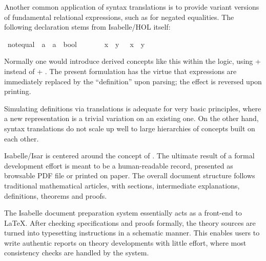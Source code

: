 \begin{isabellebody}
\begin{isamarkuptext}
  \medskip Another common application of syntax translations is to
  provide variant versions of fundamental relational expressions, such
  as \isa{{\isasymnoteq}} for negated equalities.  The following declaration
  stems from Isabelle/HOL itself:%
\end{isamarkuptext}%
\isamarkuptrue%
\ {\isachardoublequote}{\isacharunderscore}not{\isacharunderscore}equal{\isachardoublequote}\ {\isacharcolon}{\isacharcolon}\ {\isachardoublequote}{\isacharprime}a\ {\isasymRightarrow}\ {\isacharprime}a\ {\isasymRightarrow}\ bool{\isachardoublequote}\ \ \ \ {\isacharparenleft}\ {\isachardoublequote}{\isasymnoteq}{\isasymignore}{\isachardoublequote}\ {}{}{\isacharparenright}\isanewline
\isamarkupfalse%
\ {\isachardoublequote}x\ {\isasymnoteq}{\isasymignore}\ y{\isachardoublequote}\ {\isasymrightleftharpoons}\ {\isachardoublequote}{\isasymnot}\ {\isacharparenleft}x\ {\isacharequal}\ y{\isacharparenright}{\isachardoublequote}\isamarkupfalse%
%
\begin{isamarkuptext}%
\noindent Normally one would introduce derived concepts like this
  within the logic, using  + 
  instead of  + .  The
  present formulation has the virtue that expressions are immediately
  replaced by the ``definition'' upon parsing; the effect is reversed
  upon printing.

  Simulating definitions via translations is adequate for very basic
  principles, where a new representation is a trivial variation on an
  existing one.  On the other hand, syntax translations do not scale
  up well to large hierarchies of concepts built on each other.%
\end{isamarkuptext}%
\isamarkuptrue%
%
\isamarkuptrue%
%
\begin{isamarkuptext}%
Isabelle/Isar is centered around the concept of .  The ultimate result of a
  formal development effort is meant to be a human-readable record,
  presented as browsable PDF file or printed on paper.  The overall
  document structure follows traditional mathematical articles, with
  sections, intermediate explanations, definitions, theorems and
  proofs.

  \medskip The Isabelle document preparation system essentially acts
  as a front-end to {\LaTeX}.  After checking specifications and
  proofs formally, the theory sources are turned into typesetting
  instructions in a schematic manner.  This enables users to write
  authentic reports on theory developments with little effort, where
  most consistency checks are handled by the system.


\end{isamarkuptext}
\end{isabellebody}
